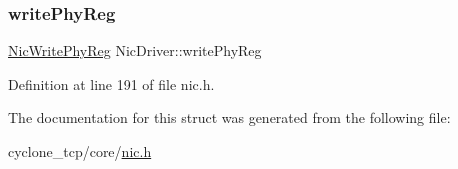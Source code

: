 \subsubsection{\texorpdfstring{write\+Phy\+Reg}{writePhyReg}}
{\footnotesize\ttfamily \hyperlink{nic_8h_a5b15217319f2376ad4dd5c883ee6924a}{Nic\+Write\+Phy\+Reg} Nic\+Driver\+::write\+Phy\+Reg}



Definition at line 191 of file nic.\+h.



The documentation for this struct was generated from the following file\+:\begin{DoxyCompactItemize}
\item 
cyclone\+\_\+tcp/core/\hyperlink{nic_8h}{nic.\+h}\end{DoxyCompactItemize}
